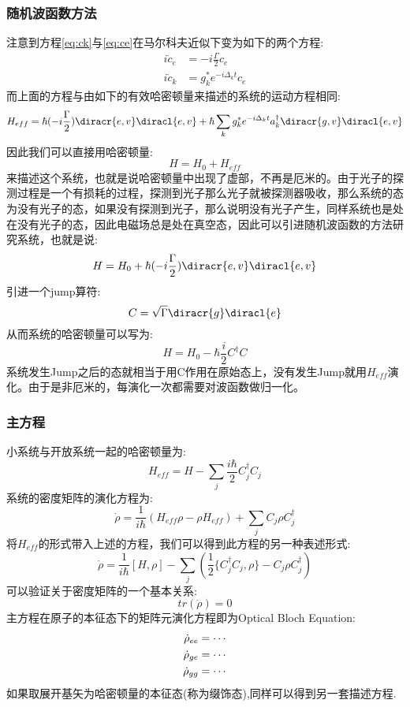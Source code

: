 \subsubsection{随机波函数方法}
注意到方程\ref{eq:ck}与\ref{eq:ce}在马尔科夫近似下变为如下的两个方程:
\begin{align}
i\dot{c}_e&=-i\frac{\Gamma}{2}c_e\\
i\dot{c}_k&=g^*_ke^{-i\Delta_kt}c_e
\end{align}
而上面的方程与由如下的有效哈密顿量来描述的系统的运动方程相同:
\[H_{eff}=\hbar(-i\frac{\Gamma}{2})\diracr{e,v}\diracl{e,v}+\hbar\sum_kg^*_ke^{-i\Delta_kt}a^\dagger_k\diracr{g,v}\diracl{e,v}\]
因此我们可以直接用哈密顿量:
\[H=H_0+H_{eff}\]
来描述这个系统，也就是说哈密顿量中出现了虚部，不再是厄米的。由于光子的探测过程是一个有损耗的过程，探测到光子那么光子就被探测器吸收，那么系统的态为没有光子的态，如果没有探测到光子，那么说明没有光子产生，同样系统也是处在没有光子的态，因此电磁场总是处在真空态，因此可以引进随机波函数的方法研究系统，也就是说:
\[H=H_0+\hbar(-i\frac{\Gamma}{2})\diracr{e,v}\diracl{e,v}\]
引进一个jump算符:
\[C=\sqrt{\Gamma}\diracr{g}\diracl{e}\]
从而系统的哈密顿量可以写为:
\[H=H_0-\hbar\frac{i}{2}C^\dagger C\]
系统发生Jump之后的态就相当于用C作用在原始态上，没有发生Jump就用$H_{eff}$演化。由于是非厄米的，每演化一次都需要对波函数做归一化。

\subsubsection{主方程}
小系统与开放系统一起的哈密顿量为:
\[H_{eff}=H-\sum_j\frac{i\hbar}{2}C^{\dagger}_jC_j\]
系统的密度矩阵的演化方程为:
\[\dot{\rho}=\frac{1}{i\hbar}(H_{eff}\rho-\rho H_{eff})+\sum_jC_j\rho C^{\dagger}_j\]
将$H_{eff}$的形式带入上述的方程，我们可以得到此方程的另一种表述形式:
\[\dot{\rho}=\frac{1}{i\hbar}[H,\rho]-\sum_j(\frac{1}{2}\{C^{\dagger}_jC_j,\rho\}-C_j\rho C^{\dagger}_j)\]
可以验证关于密度矩阵的一个基本关系:
\[tr(\dot{\rho})=0\]
主方程在原子的本征态下的矩阵元演化方程即为Optical Bloch Equation:
\begin{align}
\notag\dot{\rho}_{ee}&=\cdots\\
\notag\dot{\rho}_{ge}&=\cdots\\
\notag\dot{\rho}_{gg}&=\cdots
\end{align}
如果取展开基矢为哈密顿量的本征态(称为缀饰态),同样可以得到另一套描述方程.

